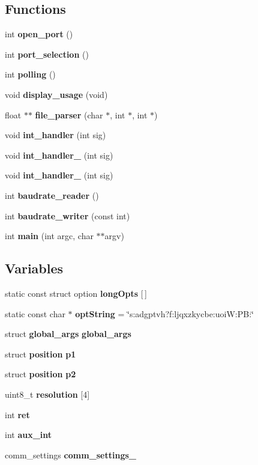 \subsection*{Functions}
\begin{DoxyCompactItemize}
\item 
\mbox{\label{qbadmin_8c_abe553924eef0ba8079dc745caf1f348c}} 
int {\bfseries open\+\_\+port} ()
\item 
\mbox{\label{qbadmin_8c_a3939d4ef4a0e2be02b1eb9e1994ec985}} 
int {\bfseries port\+\_\+selection} ()
\item 
\mbox{\label{qbadmin_8c_a22b6aac07ec93fb920cc09b13175fa20}} 
int {\bfseries polling} ()
\item 
void \textbf{ display\+\_\+usage} (void)
\item 
float $\ast$$\ast$ \textbf{ file\+\_\+parser} (char $\ast$, int $\ast$, int $\ast$)
\item 
void \textbf{ int\+\_\+handler} (int sig)
\item 
void \textbf{ int\+\_\+handler\+\_} (int sig)
\item 
void \textbf{ int\+\_\+handler\+\_} (int sig)
\item 
int \textbf{ baudrate\+\_\+reader} ()
\item 
\mbox{\label{qbadmin_8c_abab28310fbbbcecb4658ce38e10ae89a}} 
int {\bfseries baudrate\+\_\+writer} (const int)
\item 
int \textbf{ main} (int argc, char $\ast$$\ast$argv)
\end{DoxyCompactItemize}
\subsection*{Variables}
\begin{DoxyCompactItemize}
\item 
static const struct option {\bfseries long\+Opts} [$\,$]
\item 
\mbox{\label{qbadmin_8c_a1b7271ddd60c22960c39ae6caf4d5254}} 
static const char $\ast$ {\bfseries opt\+String} = \char`\"{}s\+:adgptvh?f\+:ljqxzkycbe\+:uoi\+W\+:\+P\+B\+:\char`\"{}
\item 
\mbox{\label{qbadmin_8c_ac8e0866643ba994eff3e2fa3203885e0}} 
struct \textbf{ global\+\_\+args} {\bfseries global\+\_\+args}
\item 
\mbox{\label{qbadmin_8c_a821afb7ce4f1050e40bf615da3259a67}} 
struct \textbf{ position} {\bfseries p1}
\item 
\mbox{\label{qbadmin_8c_aeb1c5de60c0abd963c4b508d9f4c3cb1}} 
struct \textbf{ position} {\bfseries p2}
\item 
\mbox{\label{qbadmin_8c_a761d62937db066110a8f3e1479e8c404}} 
uint8\+\_\+t {\bfseries resolution} [4]
\item 
\mbox{\label{qbadmin_8c_a6baa346e44f4c2158d2be4f9b77b8203}} 
int {\bfseries ret}
\item 
\mbox{\label{qbadmin_8c_abf8643fca8c83efc67b50d0f2ecc8534}} 
int {\bfseries aux\+\_\+int}
\item 
\mbox{\label{qbadmin_8c_ae80455d5ff9aa4415b211f9842cb885e}} 
comm\+\_\+settings {\bfseries comm\+\_\+settings\+\_}
\end{DoxyCompactItemize}



